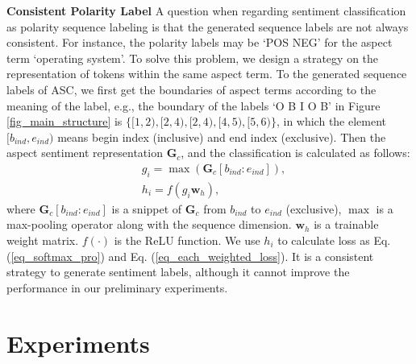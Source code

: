 \documentclass[11pt,a4paper]{article}
\begin{document}
\noindent
\textbf{Consistent Polarity Label}\quad 
A question when regarding sentiment classification as polarity sequence labeling is that the generated sequence labels are not always consistent. For instance, the polarity labels may be `POS NEG' for the aspect term `operating system'. To solve this problem, we design a strategy on the representation of tokens within the same aspect term. To the generated sequence labels of ASC, we first get the boundaries of aspect terms according to the meaning of the label, e.g., the boundary of the labels `O B I O B' in Figure \ref{fig_main_structure} is $\{[1, 2), [2,4), [2,4), [4,5), [5,6)\}$, in which the element $[b_{ind}, e_{ind})$ means begin index (inclusive) and end index (exclusive). Then the aspect sentiment representation $\mathbf{G}_{c}$, and the classification is calculated as follows:
\begin{align}
    &g_i = \max (\mathbf{G}_{c}[b_{ind}:e_{ind}]), \\
    &h_i = f(g_i\mathbf{w}_h),
\end{align}
where $\mathbf{G}_{c}[b_{ind}:e_{ind}]$ is a snippet of $\mathbf{G}_{c}$ from $b_{ind}$ to $e_{ind}$ (exclusive), $\max$ is a max-pooling operator along with the sequence dimension. $\mathbf{w}_h$ is a trainable weight matrix. $f(\cdot)$ is the ReLU function. We use $h_i$ to calculate loss as Eq. (\ref{eq_softmax_pro}) and Eq. (\ref{eq_each_weighted_loss}). It is a consistent strategy to generate sentiment labels, although it cannot improve the performance in our preliminary experiments.

\section{Experiments}
\label{sec_experiments}
\end{document}
